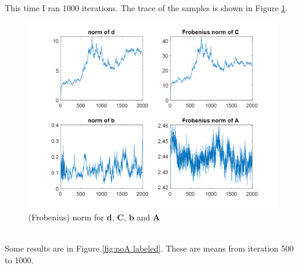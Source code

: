 \documentclass[]{article}
\begin{document}
This time I ran 1000 iterations. The trace of the samples is shown in Figure \ref{noA norms}.
\begin{figure}[h!]
	\centering
	\includegraphics[width = .8\textwidth]{noA_blk_trace.png}
	\caption{(Frobenius) norm for \(\mathbf{d}\), \(\mathbf{C}\), \(\mathbf{b}\) and \(\mathbf{A}\)}
	\label{noA norms}
\end{figure}\\

Some results are in Figure \ref{fig:noA labeled}. These are means from iteration 500 to 1000.
\end{document}
